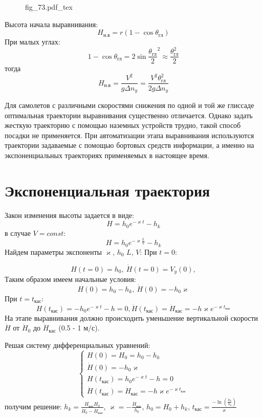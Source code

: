 \documentclass{article}
\begin{document}
\begin{figure}[H]
	\centering
	{fig_73.pdf_tex}
\end{figure}


Высота начала выравнивания:
\[
	H_{н.в}    = r (1 - \cos{\theta_{гл}})
\]
При малых углах:
\[
	1 - \cos{\theta_{гл}}= 2 \sin{\frac{\theta_{гл}}{2}}^2 \approx
	\frac{\theta_{гл}^2}{ 2}
\]
тогда
\[
	H_{н.в} = \frac{V^2}{g \Delta n_y} =\frac{V^2 \theta_{гл}^2}{2g \Delta n_y}
\]

Для самолетов с различными скоростями снижения по одной и той же глиссаде
оптимальная траектории выравнивания существенно отличается. Однако задать
жесткую траекторию с помощью наземных устройств трудно, такой способ посадки не
применяется. При автоматизации этапа выравнивания используются траектории
задаваемые с помощью бортовых средств информации, а именно на экспоненциальных
траекториях применяемых в настоящее время.
\section{Экспоненциальная траектория}
Закон изменения высоты задается в виде:
\[
	H = h_0 e^{-\varkappa t } - h_k
\]
в случае $V = const$:
\[
	H = h_0 e^{-\varkappa \frac{L}{V}} - h_k
\]
Найдем параметры экспоненты $\varkappa$, $h_0$ $L$, $V$:
При $t = 0$:

\[
	H(t=0) = h_0, \ \dot{H}(t = 0) =  V_y (0),
\]
Таким образом имеем начальные условия:
\[
	H(0) = h_0 - h_{k},\ \dot{H}(0) = -h_0 \varkappa
\]
При $t = t_{кас}$:
\[
	H(t_{кас}) = - h_0 e^{-\varkappa t} - h = 0, \dot{H}(t_{кас}) =
	\dot{H}_{кас} = - h \varkappa e^{- \varkappa t_{кас}}
\]
На этапе выравнивания должно происходить уменьшение вертикальной скорости
$\dot{H}$ от $\dot{H}_0$ до $\dot{H}_{кас}$ (0.5 - 1 $м/с$).

Решая систему дифференциальных уравнений:
\begin{equation}
	\begin{cases}
		H(0) = H_0 = h_0 - h_k                    \\
		\dot{H}(0) = - h_0 \varkappa              \\
		H(t_{кас}) = h_0 e^{-\varkappa t} - h = 0 \\
		\dot{H}(t_{кас}) = \dot{H}_{кас} = -h \varkappa e^{-\varkappa t_{кас}}
	\end{cases}
\end{equation}
получим решение:
$h_k = \frac{\dot{H}_{кас} H_0}{\dot{H}_0 - \dot{H}_{кас}}$, $\varkappa = -
	\frac{\dot{H}_{кас}}{h_k}$, $h_0 = H_0 + h_k$, $t_{кас} = \frac{-
		\ln(\frac{h_k}{h_0})}{\varkappa}$
\end{document}
